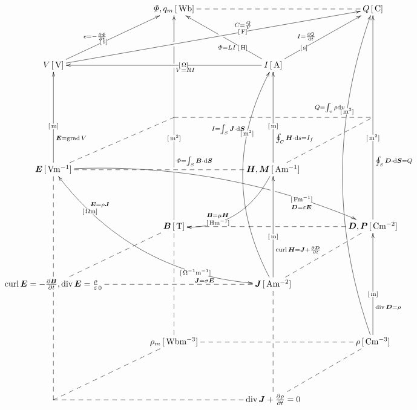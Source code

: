\documentclass[a4j,10pt]{jarticle}
\makeatletter
\def\uni#1{[\unit{#1}]}
\def\cell#1#2{#1\,\uni{#2}}
\def\dottedhole#1{\ar@{--}[#1]|!{[ld];[lu]}\hole}
\def\dotted#1{\ar@{--}[#1]}
\def\arrow#1#2#3{\ar[#1]|-(.4){\uni{#2}}_(.3){#3}}
\def\arroww#1#2#3{\ar[#1]|-(.25){\uni{#2}}^(.4){#3}|!{[ll];[ru]}\hole}
\def\arrowu#1#2#3{\ar[#1]|-(.4){\uni{#2}}^(.40){#3}}
\def\arrowx#1#2#3{\ar[#1]|-(.6){\uni{#2}}^(.6){#3}}
\def\arrowy#1#2#3{\ar@/^3pc/[#1]|-(.7){\uni{#2}}^(.7){#3}}
\def\arrowyy#1#2#3#4#5{\ar@/_3pc/@{<->}[#1]|-(0.2){\uni{#4}}^(0.2){#5}|-(.75){\uni{#2}}_(.75){#3}}
\def\arrowz#1#2#3{\ar@/^2pc/[#1]|-(.7){\uni{#2}}_(.6){#3}}
\def\arrowzz#1#2#3{\ar@/^2pc/[#1] |!{[rr];[rrdd]}\hole |-(.8){\uni{#2}}_(.8){#3\quad}}
\def\arrowp#1#2#3{\ar@{->}[#1] _(.3){#3} |!{[u];[u]}\hole |-(0.4){\uni{#2}} |!{[uuu];[uuu]}\hole |!{[luuu];[ruuuru]}\hole} %
\def\B{\bm B}
\def\D{\bm D}
\def\E{\bm E}
\def\H{\bm H}
\def\J{\bm J}
\def\S{\bm S}
\def\P{\bm P}
\def\M{\bm M}
\makeatother
\begin{document}
\[\xymatrix@=0.70in{
 & \cell{\varPhi, q_m}{Wb}\dotted{rr}\ar @{-}[d]|!{[ld];[rr]}\hole     &        & \cell{Q}{C}\\
 \cell V V\arrowu{ur}{s}{e=-\fracpd\varPhi t}\arrowx{rrru}{F}{C=\frac Q V}      &          & \cell I A\arrowu{ll}{O}{V=RI}\arroww{ur}{s}{I=\diff Q t}\arroww{lu}{H}{\varPhi=LI}        & \\
 & *=0{}         & *=0{}       & \dottedhole{ll}\dotted{ld}\\
 \cell{\E}{Vm^{-1}}\arrow{uu}{m}{\E=\grad V}\dotted{rr}\dotted{ru}\arrowzz{rrrd}{Fm^{-1}}{\D=\varepsilon\E}\arrowyy{rrdd}{O^{-1}m^{-1}}{\J=\sigma\E}{Om}{\E=\rho\J } &          & \cell{\H,\M}{Am^{-1}}\arrow{uu}{m}{\oint_C\H\cdot\dd s=I_f}\arrowz{dl}{Hm^{-1}}{\B=\mu\H}       & \\
 & \cell{\B}{T}\arrowp{uuuu}{m^2}{\varPhi=\int_S\B\cdot\dd\S} &        & \cell{\D,\P}{Cm^{-2}}\arrow{uuuu}{m^2}{\oint_S\D\cdot\dd\bm{S}=Q}\dottedhole{ll}\dotted{ld}\\
 {{\curl\E=-\frac{\partial\B}{\partial t}} ,{\diver\E=\frac\rho\varepsilon_0}}\dotted{uu}\dotted{rr}\dotted{ru}     &          & \cell{\J}{Am^{-2}}\arrow{uu}{m}{\curl\H=\J +\frac{\partial\D}{\partial t}}\arrowy{uuuu}{m^2}{I=\int_S\J\cdot\dd\S}\\
 & \cell{\rho_m}{Wbm^{-3}}\ar@{--}[uu]|!{[u];[u]}\hole      &        & \cell{\rho}{Cm^{-3}}\arrow{uu}{m}{\diver\D=\rho}\arrowy{uuuuuu}{m^3}{Q=\int_v\rho\dd v}\dottedhole{ll}\dotted{ld}\\
 *=0{} \dotted{uu}\dotted{rr}\dotted{ru}           &          & \diver\J +\frac{\partial\rho}{\partial t}=0\dotted{uu}      & \\
}\]
\end{document}

